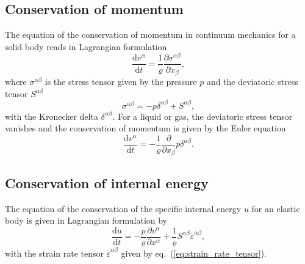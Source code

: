 \documentclass[10pt,fleqn,twoside]{article}
\begin{document}
\subsection{Conservation of momentum}
The equation of the conservation of momentum in continuum mechanics for a solid body reads in Lagrangian formulation
\begin{equation}
 \label{eq:conservation_of_momentum}
 \frac{\mathrm{d} {v^\alpha}}{\mathrm{d}t} =  \frac{1}{\varrho}  \frac{\partial \sigma^{\alpha
   \beta} }{\partial x_\beta},
\end{equation}
where $\sigma^{\alpha\beta}$ is the stress tensor given by the pressure $p$ and the deviatoric stress tensor
${S}^{\alpha \beta}$
\begin{equation}
 \sigma^{\alpha \beta} = -p \delta^{\alpha \beta} + S^{\alpha \beta},
\end{equation}
with the Kronecker delta $\delta^{\alpha \beta}$.
For a liquid or gas, the deviatoric stress tensor vanishes and the conservation of momentum is given by the Euler
equation
\begin{equation}
 \frac{\mathrm{d} {v^\alpha}}{\mathrm{d}t} =  - \frac{1}{\varrho}  \frac{\partial}{\partial x_\beta} p \delta^{\alpha \beta}.
\end{equation}
\subsection{Conservation of internal energy}
The equation of the conservation of the specific internal energy $u$ for an elastic body is given in Lagrangian formulation by
\begin{equation}
 \label{eq:conservation_internal_energy}
 \frac{\mathrm{d} u }{\mathrm{d} t} = - \frac{p}{\varrho} \frac{\partial v ^\alpha}{\partial x^\alpha} + \frac{1}{\varrho}
 S^{\alpha \beta} \dot{\varepsilon}^{\alpha \beta},
\end{equation}
with the strain rate tensor $\dot{\varepsilon}^{\alpha \beta}$ given by eq.~(\ref{eq:strain_rate_tensor}).
\end{document}
